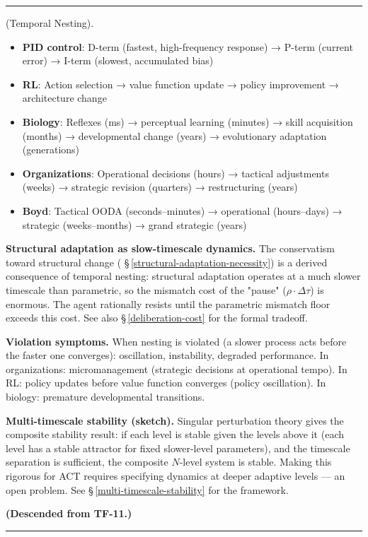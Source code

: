 \documentclass[11pt,oneside]{article}
\newcounter{claim}[section]
\renewcommand{\theclaim}{\thesection.\arabic{claim}}
\newenvironment{segment}[2]{%
  \refstepcounter{claim}%
  \bigskip\noindent\hrule\smallskip
  \noindent{\bfseries #1~\theclaim}\enskip(#2).\par\smallskip
  \noindent\ignorespaces
}{%
  \par\smallskip\noindent\hrule\bigskip
}
\newenvironment{proposition}[1][]{\begin{segment}{Proposition}{#1}}{\end{segment}}
\begin{document}
\begin{proposition}[Temporal Nesting]
\begin{itemize}
  \item \textbf{PID control}: D-term (fastest, high-frequency response) → P-term (current error) → I-term (slowest, accumulated bias)
  \item \textbf{RL}: Action selection → value function update → policy improvement → architecture change
  \item \textbf{Biology}: Reflexes (ms) → perceptual learning (minutes) → skill acquisition (months) → developmental change (years) → evolutionary adaptation (generations)
  \item \textbf{Organizations}: Operational decisions (hours) → tactical adjustments (weeks) → strategic revision (quarters) → restructuring (years)
  \item \textbf{Boyd}: Tactical OODA (seconds–minutes) → operational (hours–days) → strategic (weeks–months) → grand strategic (years)
\end{itemize}


\textbf{Structural adaptation as slow-timescale dynamics.} The conservatism toward structural change ( \S\,\ref{structural-adaptation-necessity}) is a derived consequence of temporal nesting: structural adaptation operates at a much slower timescale than parametric, so the mismatch cost of the "pause" ($\rho \cdot \Delta\tau$) is enormous. The agent rationally resists until the parametric mismatch floor exceeds this cost. See also \S\,\ref{deliberation-cost} for the formal tradeoff.

\textbf{Violation symptoms.} When nesting is violated (a slower process acts before the faster one converges): oscillation, instability, degraded performance. In organizations: micromanagement (strategic decisions at operational tempo). In RL: policy updates before value function converges (policy oscillation). In biology: premature developmental transitions.

\textbf{Multi-timescale stability (sketch).} Singular perturbation theory gives the composite stability result: if each level is stable given the levels above it (each level has a stable attractor for fixed slower-level parameters), and the timescale separation is sufficient, the composite $N$-level system is stable. Making this rigorous for ACT requires specifying dynamics at deeper adaptive levels — an open problem. See \S\,\ref{multi-timescale-stability} for the framework.

\textbf{(Descended from TF-11.)}

\end{proposition}
\end{document}
